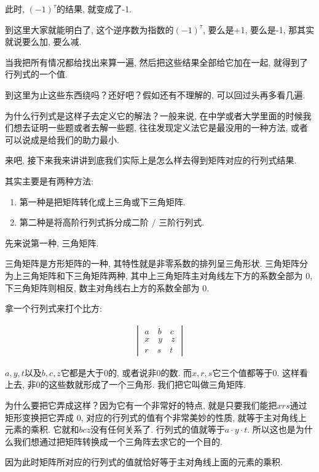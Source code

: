此时, $(-1)^\tau$的结果, 就变成了-1. 

到这里大家就能明白了, 这个逆序数为指数的$(-1)^\tau$, 要么是+1, 要么是-1, 那其实就说要么加, 要么减. 

当我把所有情况都给找出来算一遍, 然后把这些结果全部给它加在一起, 就得到了行列式的一个值. 

到这里为止这些东西绕吗？还好吧？假如还有不理解的, 可以回过头再多看几遍. 

为什么行列式是这样子去定义它的解法？一般来说, 在中学或者大学里面的时候我们想去证明一些题或者去解一些题, 往往发现定义法它是最没用的一种方法, 或者可以说成是给我们的助力最小. 

来吧, 接下来我来讲讲到底我们实际上是怎么样去得到矩阵对应的行列式结果. 

其实主要是有两种方法: 

\begin{enumerate}
  \item 第一种是把矩阵转化成上三角或下三角矩阵. 
  \item 第二种是将高阶行列式拆分成二阶 $/$ 三阶行列式. 
\end{enumerate}

先来说第一种, 三角矩阵. 

三角矩阵是方形矩阵的一种, 其特性就是非零系数的排列呈三角形状. 三角矩阵分为上三角矩阵和下三角矩阵两种, 其中上三角矩阵主对角线左下方的系数全部为 0,  下三角矩阵则相反, 数主对角线右上方的系数全部为 0.

拿一个行列式来打个比方: 

\begin{align*}
  \begin{vmatrix}
    a \quad b \quad c \\
    x \quad y \quad z \\
    r \quad s \quad t
  \end{vmatrix}
\end{align*}

$a, y, t$以及$b, c, z$它都是大于$0$的, 或者说非$0$的数. 而$x, r, s$它三个值都等于$0$. 这样看上去, 非$0$的这些数就形成了一个三角形. 我们把它叫做三角矩阵. 

为什么要把它弄成这样？因为它有一个非常好的特点, 就是只要我们能把$xrs$通过矩形变换把它弄成 0, 对应的行列式的值有个非常美妙的性质, 就等于主对角线上元素的乘积. 它就和$bcz$没有任何关系了. 行列式的值就等于$a \cdot y \cdot t$. 所以这也是为什么我们想通过把矩阵转换成一个三角阵去求它的一个目的. 

因为此时矩阵所对应的行列式的值就恰好等于主对角线上面的元素的乘积. 

